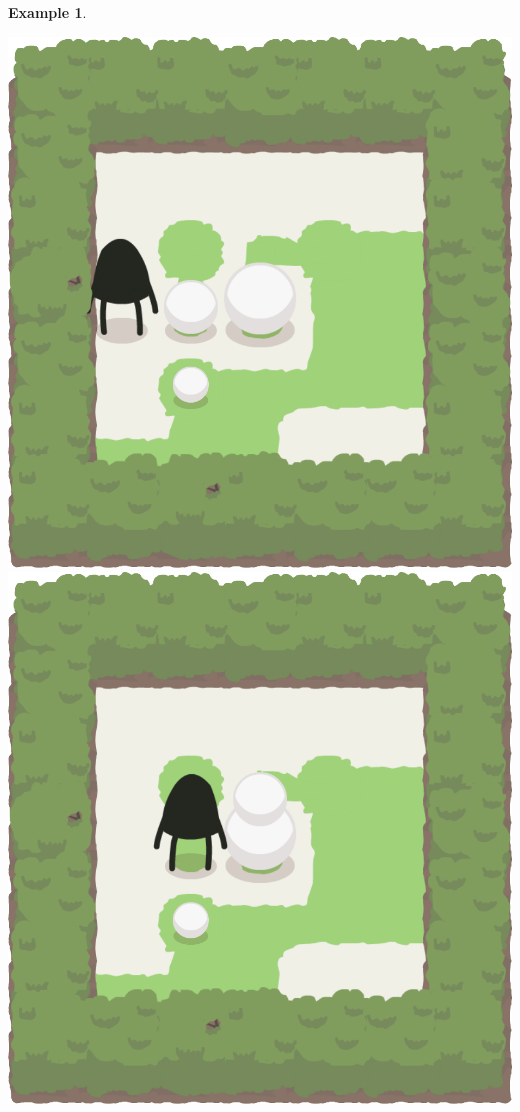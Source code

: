 \documentclass{report}
\theoremstyle{plain}
\newtheorem{example}{Example}[section]
\begin{document}
\begin{example}
\begin{center}
\includegraphics[width=\andyWidth\textwidth]{andy-basic-13.png} \quad
\includegraphics[width=\andyWidth\textwidth]{andy-basic-14.png} \quad

\end{center}
\end{example}
\end{document}
